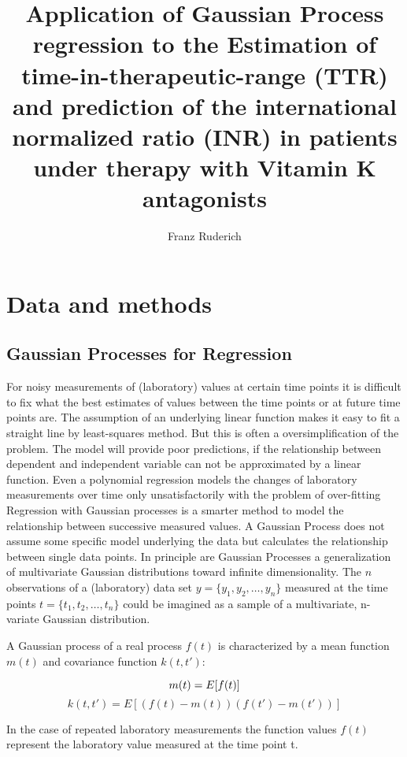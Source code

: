 \documentclass[12pt]{article}
\title{Application of Gaussian Process regression to the Estimation of time-in-therapeutic-range (TTR) and prediction of the international normalized ratio (INR) in patients under therapy with Vitamin K antagonists}
\author{Franz Ruderich}
\begin{document}
	\maketitle
	
	
	
	\section{Data and methods}
	
	\subsection{Gaussian Processes for Regression}
	For noisy measurements of (laboratory) values at certain time points it is difficult to fix
	what the best estimates of values between the time points or at future time points are.
	The assumption of an underlying linear function makes it easy to fit a straight line by least-squares method. But this is often a oversimplification of the problem. The model will provide poor predictions, if the relationship between  dependent and independent variable can not be approximated by a linear function.
	Even a polynomial regression models the changes of laboratory measurements  over time only unsatisfactorily with the problem of over-fitting
	Regression with Gaussian processes is a smarter method to model the relationship between successive measured values. 
	A Gaussian Process does not assume some specific model underlying the data but calculates the relationship between single data points.
	In principle are Gaussian Processes a generalization of multivariate Gaussian distributions toward infinite dimensionality.
	The $n$ observations of a (laboratory) data set $y=\{y_{1},y_{2}, \ldots ,y_{n}\}$ measured at the time points $t=\{t_{1},t_{2}, \ldots ,t_{n}\}$ could be imagined as a sample of a multivariate, n-variate Gaussian distribution.
	
	A Gaussian process of a real process $f(t)$ is characterized by a mean function $m(t)$ and covariance function $k(t,t')$:
	
	\begin{displaymath}
	m(t) = E[f(t)]\\
	\end{displaymath}
	\begin{displaymath}
	k(t,t') = E[(f(t)-m(t)) (f(t')-m(t'))]
	\end{displaymath}   
	
	In the case of repeated laboratory measurements the function values $f(t)$ represent the laboratory value measured at the time point t.
	   
\end{document}

